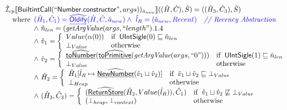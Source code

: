 \[\begin{array}{l}
\hat{\mathcal{I}} _{cp}\llbracket \mbox{\textsf{BuiltintCall}}(``\mbox{\textsf{Number.constructor}}",args))_{\hat{a}_{new}}\rrbracket((\hat{H},\hat{C}), \hat{S})
  = ((\hat{H}_3, \hat{C}_3), \hat{S})\\
\quad{\rm where}\begin{array}[t]{l}
  \color{blue} (\hat{H}_1, \hat{C}_1) = \widehat{\underline{\sf Oldify}}(\hat{H}, \hat{C}, \hat{a}_{new})
  \land\ \color{blue}\hat{l}_{R} = (\hat{a}_{new}, Recent)
    \quad\textit{{\color{blue}// Recency Abstraction}}\\
  \land\ \hat{n}_{len} = (\emph{getArgValue}(args, ``length").1.4\\
  \land\ \hat{v}_1 = \left\{\begin{array}{ll}
      Value(\alpha(0)) & {\rm if}\begin{array}[t]{l}\mbox{\textsf{UIntSigle}}(0) \sqsubseteq \hat{n}_{len}\end{array}\\
      \bot_{Value} & {\rm otherwise}
    \end{array}\right.\\
  \land\ \hat{v}_2 = \left\{\begin{array}{ll}
      \widehat{\underline{\sf toNumber}}(\widehat{\underline{\sf toPrimitive}}(\emph{getArgValue}(args, ``0"))) & {\rm if}\begin{array}[t]{l}\mbox{\textsf{UIntSigle}}(1) \sqsubseteq \hat{n}_{len}\end{array}\\
      \bot_{Value} & {\rm otherwise}
    \end{array}\right.\\
  \land\ \hat{H}_2 = \left\{\begin{array}{ll}
       \hat{H}_1[\hat{l}_R \mapsto \widehat{\underline{\sf NewNumber}}(\hat{v}_1 \sqcup \hat{v}_2)] & {\rm if}\begin{array}[t]{l}\hat{v}_1 \sqcup \hat{v}_2 \sqsubseteq \bot_{Value}\end{array}\\
      \bot_{Heap} & {\rm otherwise}
    \end{array}\right.\\
  \land\ (\hat{H}_3, \hat{C}_3) = 
    \left\{\begin{array}{ll}
      (\widehat{\underline{\sf ReturnStore}}(\hat{H}_2, Value(\hat{l}_R)), \hat{C}_1)
      & {\rm if}\begin{array}[t]{l}\hat{v}_1 \sqcup \hat{v}_2 \not\sqsubseteq \bot_{Value}\end{array}\\
      (\bot_{heap}, \bot_{context}) & {\rm otherwise} \\
    \end{array}\right.\\
  \end{array}\\
\end{array}
\]


